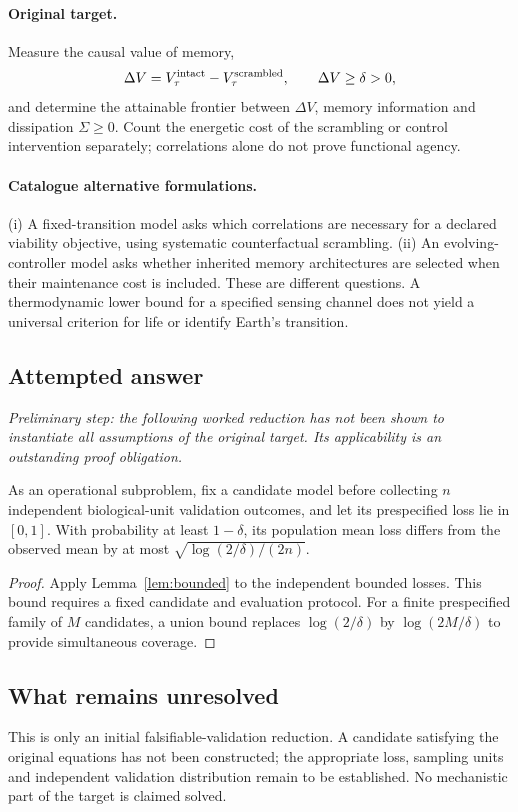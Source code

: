 \documentclass[11pt]{article}
\begin{document}
\paragraph{Original target.}
Measure the causal value of memory,
\[
\Delta V=V_\tau^{\rm intact}-V_\tau^{\rm scrambled},
\qquad \Delta V\geq\delta>0,
\]
and determine the attainable frontier between $\Delta V$, memory information and dissipation $\Sigma\geq0$. Count the energetic cost of the scrambling or control intervention separately; correlations alone do not prove functional agency.
\paragraph{Catalogue alternative formulations.}
(i) A fixed-transition model asks which correlations are necessary for a declared viability objective, using systematic counterfactual scrambling. (ii) An evolving-controller model asks whether inherited memory architectures are selected when their maintenance cost is included. These are different questions. A thermodynamic lower bound for a specified sensing channel does not yield a universal criterion for life or identify Earth's transition.
\subsection{Attempted answer}
\noindent\emph{Preliminary step: the following worked reduction has not been shown to instantiate all assumptions of the original target. Its applicability is an outstanding proof obligation.}

\begin{proposition}
As an operational subproblem, fix a candidate model before collecting $n$ independent biological-unit validation outcomes, and let its prespecified loss lie in $[0,1]$. With probability at least $1-\delta$, its population mean loss differs from the observed mean by at most $\sqrt{\log(2/\delta)/(2n)}$.
\end{proposition}
\begin{proof}
Apply Lemma~\ref{lem:bounded} to the independent bounded losses. This bound requires a fixed candidate and evaluation protocol. For a finite prespecified family of $M$ candidates, a union bound replaces $\log(2/\delta)$ by $\log(2M/\delta)$ to provide simultaneous coverage.
\end{proof}
\subsection{What remains unresolved}
This is only an initial falsifiable-validation reduction. A candidate satisfying the original equations has not been constructed; the appropriate loss, sampling units and independent validation distribution remain to be established. No mechanistic part of the target is claimed solved.
\end{document}
